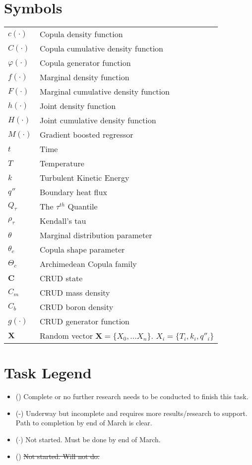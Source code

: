 \section*{Symbols}
\begin{tabular}{l l}
$c(\cdot)$ & Copula density function \\
$C(\cdot)$ & Copula cumulative density function \\
$\varphi(\cdot)$ & Copula generator function \\
$f(\cdot)$ & Marginal density function \\
$F(\cdot)$ & Marginal cumulative density function \\
$h(\cdot)$ & Joint density function \\
$H(\cdot)$ & Joint cumulative density function \\
$M(\cdot)$ & Gradient boosted regressor \\
$t$ & Time \\
$T$ & Temperature \\
$k$ & Turbulent Kinetic Energy \\
$q''$ & Boundary heat flux \\
$Q_{\tau}$ & The $\tau^{th}$ Quantile \\
$\rho_{\tau}$ & Kendall's tau \\
$\theta$ & Marginal distribution parameter \\
$\theta_c$ & Copula shape parameter \\
$\Theta_c$ & Archimedean Copula family \\
$\mathbf C$ & CRUD state \\
$C_m$ & CRUD mass density \\
$C_b$ & CRUD boron density \\
$g(\cdot)$ & CRUD generator function \\
$\mathbf X$ & Random vector $\mathbf X = \{X_0, ... X_n\}$.  $X_i = \{T_i, k_i, q''_i\}$ \\
\end{tabular}


\section*{Task Legend}

\begin{itemize}
    \item (\checkmark)  Complete or no further research needs to be conducted to finish this task.
    \item (\checkmark-)  Underway but incomplete and requires more results/research to support.  Path to completion by end of March is clear.
    \item ($\cdot$)  Not started.  Must be done by end of March.
    \item (\xmark)  \sout{Not started.  Will not do.}
\end{itemize}

\listoffigures

\listoftables

\pagebreak
